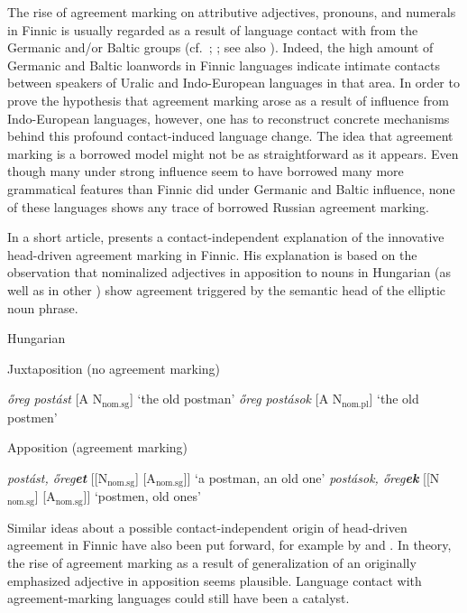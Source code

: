 {The rise of agreement marking on attributive adjectives, pronouns, and numerals in Finnic is usually regarded as a result of language contact with  from the Germanic and/or Baltic groups (cf.~\citealt[25]{tauli1955}; \citealt{hajdu1996}; see also \citealt[288–295]{stolz2015a}). Indeed, the high amount of Germanic and Baltic loanwords in Finnic languages indicate intimate contacts between speakers of Uralic and Indo-European languages in that area. In order to prove the hypothesis that agreement marking arose as a result of influence from Indo-European languages, however, one has to reconstruct concrete mechanisms behind this profound contact-induced language change. The idea that agreement marking is a borrowed model might not be as straightforward as it appears. Even though many  under strong  influence seem to have borrowed many more grammatical features than Finnic did under Germanic and Baltic influence, none of these languages shows any trace of borrowed Russian agreement marking.

In a short article, \citet{mark1979} presents a contact-independent explanation of the innovative head\hyp{}driven agreement marking in Finnic. His explanation is based on the observation that nominalized adjectives in apposition to nouns in Hungarian (as well as in other ) show agreement triggered by the semantic head of the elliptic noun phrase.
\begin{exe} \label{hung ap}
\ex \rm{Hungarian \citep[209]{mark1979}}
\begin{xlist}
\ex \rm{Juxtaposition (no agreement marking)}
\begin{xlist}
\ex \textit{őreg postást} 		\rm{[A N$_{\text{nom.sg}}$] ‘the old postman’}
\ex \textit{őreg postások} 		\rm{[A N$_{\text{nom.pl}}$] ‘the old postmen’}
\end{xlist}
\ex \rm{Apposition (agreement marking)}
\begin{xlist}
\ex \textit{postást, őreg\textbf{et}} 	\rm{[[N$_{\text{nom.sg}}$] [A$_{\text{nom.sg}}$]] ‘a postman, an old one’}
\ex \textit{postások, őreg\textbf{ek}} 	\rm{[[N$_{\text{nom.sg}}$] [A$_{\text{nom.sg}}$]] ‘postmen, old ones’}
\end{xlist}
\end{xlist}
\end{exe}
Similar ideas about a possible contact-independent origin of head\hyp{}driven agreement in Finnic have also been put forward, for example by \cite{ravila1941} and \cite{papp1962}. In theory, the rise of agreement marking as a result of generalization of an originally emphasized adjective in apposition seems plausible. Language contact with agreement-marking languages could still have been a catalyst. 

}
